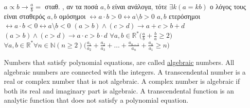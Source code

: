\documentclass[12pt]{article}
\begin{document}
\begin{flushleft}
   \textbullet \quad $ a \varpropto b \rightarrow \frac{a}{b} = $ \textgreek{σταθ. , αν τα ποσά} $a, b$ \textgreek{είναι ανάλογα, τότε} $\exists k(a =kb) $ \textgreek{ο λόγος τους είναι σταθερός} \linebreak 
   \textbullet \quad $ a, b$ \textgreek{ομόσημοι} $\leftrightarrow a\cdot b > 0 \leftrightarrow a \setminus b > 0 $ \linebreak 
   \textbullet \quad $ a, b$ \textgreek{ετερόσημοι} $\leftrightarrow a\cdot b < 0 \leftrightarrow a \setminus b < 0 $ \linebreak
   \textbullet \quad $ (a > b) \land (c > d) \rightarrow a + c > b + d $ \linebreak 
   \textbullet \quad $ (a > b) \land (c > d) \rightarrow a\cdot c > b\cdot d $ \linebreak 
   \textbullet \quad $ \forall a, b \in \mathbb{R}^* \displaystyle \Big(\frac{a}{b} + \frac{b}{a} \geq 2\Big) $ \linebreak 
   \textbullet \quad $ \forall a, b \in \mathbb{R}^* \forall n \in \mathbb{N}(n \geq 2) \displaystyle \Big(\frac{a_1}{a_2}+ \frac{a_2}{a_3} + ... + \frac{a_{n-1}}{a_n} + \frac{a_n}{a_1} \geq n \Big) $ \linebreak
	
	\textbullet \quad Numbers that satisfy polynomial equations, are called \uline{algebraic} numbers. All algebraic numbers are connected with the integers. \linebreak 
	\textbullet \quad A transcendental number is a real or complex number that is not algebraic. A complex number is algebraic if both its real and imaginary part is algebraic. \linebreak 
	\textbullet \quad A transcendental function is an analytic function that does not satisfy a polynomial equation. \linebreak 
   

\end{flushleft}
\end{document}
